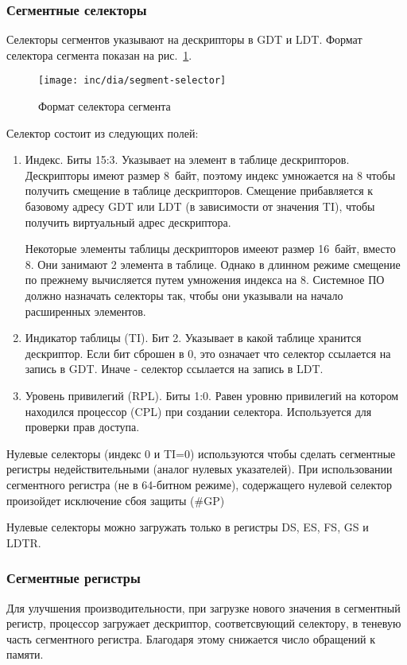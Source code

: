 \subsubsection*{Сегментные селекторы}
Селекторы сегментов указывают на дескрипторы в GDT и LDT.
Формат селектора сегмента показан на рис.~\ref{fig:segment-selector}.

\begin{figure}[ht!]
  \centering
  \texttt{[image: inc/dia/segment-selector]}
  \caption{Формат селектора сегмента}
  \label{fig:segment-selector}
\end{figure}

Селектор состоит из следующих полей:
\begin{enumerate}[1.]
\item Индекс. Биты 15:3. Указывает на элемент в таблице дескрипторов.
	Дескрипторы имеют размер 8~байт, поэтому индекс умножается на 8
	чтобы получить смещение в таблице дескрипторов. Смещение прибавляется
	к базовому адресу GDT или LDT (в зависимости от значения TI), чтобы получить
	виртуальный адрес дескриптора.

	Некоторые элементы таблицы дескрипторов имееют размер 16~байт, вместо 8.
	Они занимают 2 элемента в таблице. Однако в длинном режиме смещение по
	прежнему вычисляется путем умножения индекса на 8. Системное ПО должно
	назначать селекторы так, чтобы они указывали на начало расширенных элементов.
\item Индикатор таблицы (TI). Бит 2. Указывает в какой таблице хранится дескриптор.
	Если бит сброшен в 0, это означает что селектор ссылается на запись в GDT.
	Иначе - селектор ссылается на запись в LDT.
\item Уровень привилегий (RPL). Биты 1:0. Равен уровню привилегий на котором
	находился процессор (CPL) при создании селектора. Используется для проверки прав доступа.
\end{enumerate}

Нулевые селекторы (индекс 0 и TI=0) используются чтобы сделать сегментные
регистры недействительными (аналог нулевых указателей).
При использовании сегментного регистра (не в 64-битном режиме),
содержащего нулевой селектор произойдет исключение сбоя защиты (\#GP)

Нулевые селекторы можно загружать только в регистры DS, ES, FS, GS и LDTR.

\subsubsection*{Сегментные регистры}
Для улучшения производительности, при загрузке нового значения в сегментный регистр,
процессор загружает дескриптор, соответсвующий селектору, в теневую часть сегментного регистра.
Благодаря этому снижается число обращений к памяти.

